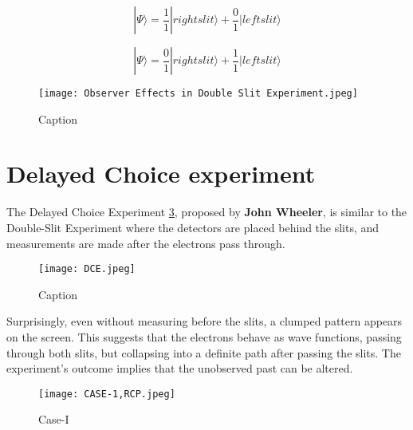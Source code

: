 \documentclass{article}
\begin{document}
\begin{equation}
    |\Psi\rangle=\frac{1}{1}|right slit\rangle+ \frac{0}{1}|left slit\rangle
\end{equation}

\begin{equation}
    |\Psi\rangle=\frac{0}{1}|right slit\rangle+ \frac{1}{1}|left slit\rangle
\end{equation}


\begin{figure}[h]
    \centering
    \texttt{[image: Observer Effects in Double Slit Experiment.jpeg]}
    \caption{Caption}
    \label{Setup for Observer Effects }
\end{figure}




\section{\Large Delayed Choice experiment}

The Delayed Choice Experiment \ref{}, proposed by \textbf{John Wheeler}, is similar to the Double-Slit Experiment where the detectors are placed behind the slits, and measurements are made after the electrons pass through. 



\begin{figure}
    \centering [h]
    \texttt{[image: DCE.jpeg]}
    \caption{Caption}
    \label{Setup for Delayed Choice Experiment}
\end{figure}

Surprisingly, even without measuring before the slits, a clumped pattern appears on the screen. This suggests that the electrons behave as wave functions, passing through both slits, but collapsing into a definite path after passing the slits. The experiment's outcome implies that the unobserved past can be altered.













\begin{figure}
\centering
     \texttt{[image: CASE-1,RCP.jpeg]}
      \caption{Case-I}
       \label{}
\end{figure}

\Large 
\end{document}
